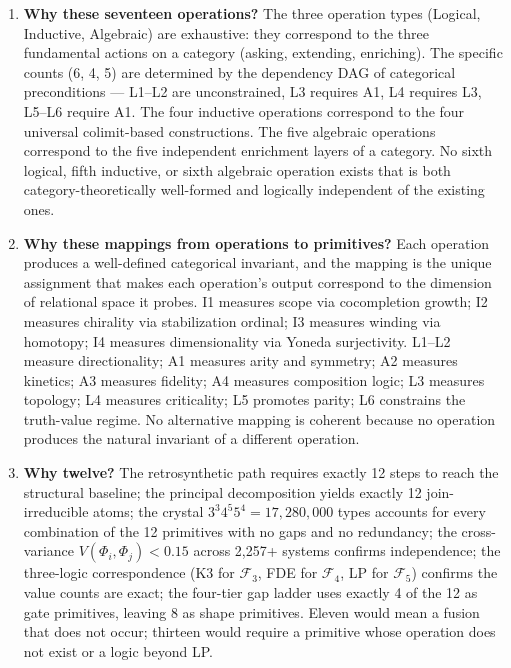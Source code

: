 \documentclass[12pt,a4paper]{article}
\begin{document}
\begin{enumerate}
  \item \textbf{Why these seventeen operations?} The three operation types (Logical, Inductive, Algebraic) are exhaustive: they correspond to the three fundamental actions on a category (asking, extending, enriching). The specific counts (6, 4, 5) are determined by the dependency DAG of categorical preconditions --- L1--L2 are unconstrained, L3 requires A1, L4 requires L3, L5--L6 require A1. The four inductive operations correspond to the four universal colimit-based constructions. The five algebraic operations correspond to the five independent enrichment layers of a category. No sixth logical, fifth inductive, or sixth algebraic operation exists that is both category-theoretically well-formed and logically independent of the existing ones.

  \item \textbf{Why these mappings from operations to primitives?} Each operation produces a well-defined categorical invariant, and the mapping is the unique assignment that makes each operation's output correspond to the dimension of relational space it probes. I1 measures scope via cocompletion growth; I2 measures chirality via stabilization ordinal; I3 measures winding via homotopy; I4 measures dimensionality via Yoneda surjectivity. L1--L2 measure directionality; A1 measures arity and symmetry; A2 measures kinetics; A3 measures fidelity; A4 measures composition logic; L3 measures topology; L4 measures criticality; L5 promotes parity; L6 constrains the truth-value regime. No alternative mapping is coherent because no operation produces the natural invariant of a different operation.

  \item \textbf{Why twelve?} The retrosynthetic path requires exactly 12 steps to reach the structural baseline; the principal decomposition yields exactly 12 join-irreducible atoms; the crystal $3^3 $\times$ 4^5 $\times$ 5^4 = 17{,}280{,}000$ types accounts for every combination of the 12 primitives with no gaps and no redundancy; the cross-variance $V(\Phi_i,\Phi_j) < 0.15$ across 2,257+ systems confirms independence; the three-logic correspondence (K3 for $\mathcal{F}_3$, FDE for $\mathcal{F}_4$, LP for $\mathcal{F}_5$) confirms the value counts are exact; the four-tier gap ladder uses exactly 4 of the 12 as gate primitives, leaving 8 as shape primitives. Eleven would mean a fusion that does not occur; thirteen would require a primitive whose operation does not exist or a logic beyond LP.
\end{enumerate}
\end{document}
